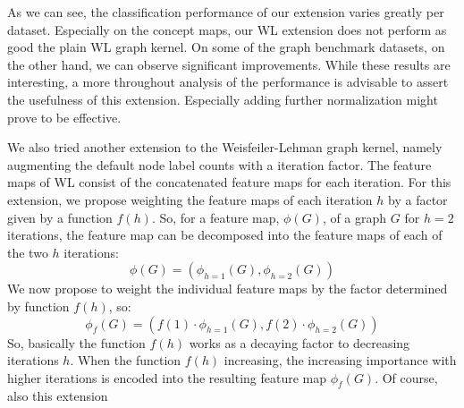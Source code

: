 As we can see, the classification performance of our extension varies greatly per dataset.
Especially on the concept maps, our WL extension does not perform as good the plain WL graph kernel.
On some of the graph benchmark datasets, on the other hand, we can observe significant improvements.
While these results are interesting, a more throughout analysis of the performance is advisable to assert the usefulness of this extension.
Especially adding further normalization might prove to be effective.

\if
We also tried another extension to the Weisfeiler-Lehman graph kernel, namely augmenting the default node label counts with a iteration factor.
The feature maps of WL consist of the concatenated feature maps for each iteration.
For this extension, we propose weighting the feature maps of each iteration $h$ by a factor given by a function $f(h)$.
So, for a feature map, $\phi(G)$, of a graph $G$ for $h=2$ iterations, the feature map can be decomposed into the feature maps of each of the two $h$ iterations:
\begin{equation*}
\phi(G)=(\phi_{h=1}(G), \phi_{h=2}(G))
\end{equation*}
We now propose to weight the individual feature maps by the factor determined by function $f(h)$, so:
\begin{equation*}
\phi_{f}(G)=(f(1) \cdot \phi_{h=1}(G), f(2) \cdot \phi_{h=2}(G))
\end{equation*}
So, basically the function $f(h)$ works as a decaying factor to decreasing iterations $h$.
When the function $f(h)$ increasing, the increasing importance with higher iterations is encoded into the resulting feature map $\phi_f(G)$.
Of course, also this extension 
\fi